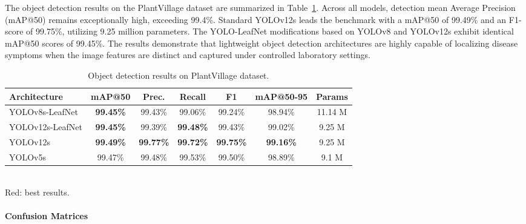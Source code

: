 \documentclass[10pt, conference]{IEEEtran}
\begin{document}
The object detection results on the PlantVillage dataset are summarized in Table~\ref{tab:det_plantvillage}. Across all models, detection mean Average Precision (mAP@50) remains exceptionally high, exceeding 99.4\%. Standard YOLOv12s leads the benchmark with a mAP@50 of 99.49\% and an F1-score of 99.75\%, utilizing 9.25 million parameters. The YOLO-LeafNet modifications based on YOLOv8 and YOLOv12s exhibit identical mAP@50 scores of 99.45\%. The results demonstrate that lightweight object detection architectures are highly capable of localizing disease symptoms when the image features are distinct and captured under controlled laboratory settings.

\begin{table}[t]
    \centering
    \caption{Object detection results on PlantVillage dataset.}
    \label{tab:det_plantvillage}
    \setlength{\tabcolsep}{4pt}
    \begin{tabular}{lcccccc}
        \toprule
        \textbf{Architecture} & \textbf{mAP@50} & \textbf{Prec.}
                              & \textbf{Recall} & \textbf{F1}
                              & \textbf{mAP@50-95} & \textbf{Params} \\
        \midrule
        YOLOv8s-LeafNet
            & \textcolor{bestred}{\textbf{99.45\%}} & 99.43\% & 99.06\% & 99.24\%
            & 98.94\% & 11.14 M \\
        YOLOv12s-LeafNet
            & \textcolor{bestred}{\textbf{99.45\%}} & 99.39\% & \textcolor{bestred}{\textbf{99.48\%}} & 99.43\%
            & 99.02\% & 9.25 M \\
        YOLOv12s
            & \textcolor{bestred}{\textbf{99.49\%}} & \textcolor{bestred}{\textbf{99.77\%}} & \textcolor{bestred}{\textbf{99.72\%}}
            & \textcolor{bestred}{\textbf{99.75\%}}
            & \textcolor{bestred}{\textbf{99.16\%}} & 9.25 M \\
        YOLOv5s
            & 99.47\% & 99.48\% & 99.53\% & 99.50\% & 98.89\% & 9.1 M \\
        \bottomrule
    \end{tabular}\\[4pt]
    {\small \textcolor{bestred}{Red}: best results.}
\end{table}

\paragraph{Confusion Matrices}
\end{document}
